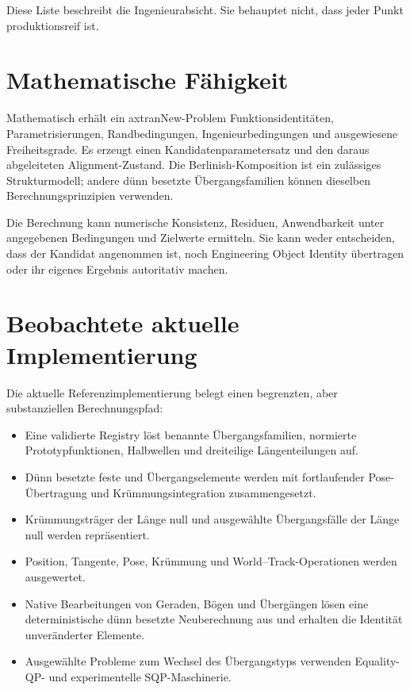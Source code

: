 Diese Liste beschreibt die Ingenieurabsicht. Sie behauptet nicht, dass jeder
Punkt produktionsreif ist.

\section{Mathematische Fähigkeit}

Mathematisch erhält ein axtranNew-Problem Funktionsidentitäten,
Parametrisierungen, Randbedingungen, Ingenieurbedingungen und ausgewiesene
Freiheitsgrade. Es erzeugt einen Kandidatenparametersatz und den daraus
abgeleiteten Alignment-Zustand. Die Berlinish-Komposition ist ein zulässiges
Strukturmodell; andere dünn besetzte Übergangsfamilien können dieselben
Berechnungsprinzipien verwenden.

Die Berechnung kann numerische Konsistenz, Residuen, Anwendbarkeit unter
angegebenen Bedingungen und Zielwerte ermitteln. Sie kann weder entscheiden,
dass der Kandidat angenommen ist, noch Engineering Object Identity übertragen
oder ihr eigenes Ergebnis autoritativ machen.

\section{Beobachtete aktuelle Implementierung}

Die aktuelle Referenzimplementierung belegt einen begrenzten, aber
substanziellen Berechnungspfad:
\begin{itemize}
\item Eine validierte Registry löst benannte Übergangsfamilien, normierte
Prototypfunktionen, Halbwellen und dreiteilige Längenteilungen auf.
\item Dünn besetzte feste und Übergangselemente werden mit fortlaufender
Pose-Übertragung und Krümmungsintegration zusammengesetzt.
\item Krümmungsträger der Länge null und ausgewählte Übergangsfälle der Länge
null werden repräsentiert.
\item Position, Tangente, Pose, Krümmung und World--Track-Operationen werden
ausgewertet.
\item Native Bearbeitungen von Geraden, Bögen und Übergängen lösen eine
deterministische dünn besetzte Neuberechnung aus und erhalten die Identität
unveränderter Elemente.
\item Ausgewählte Probleme zum Wechsel des Übergangstyps verwenden
Equality-QP- und experimentelle SQP-Maschinerie.
\end{itemize}

